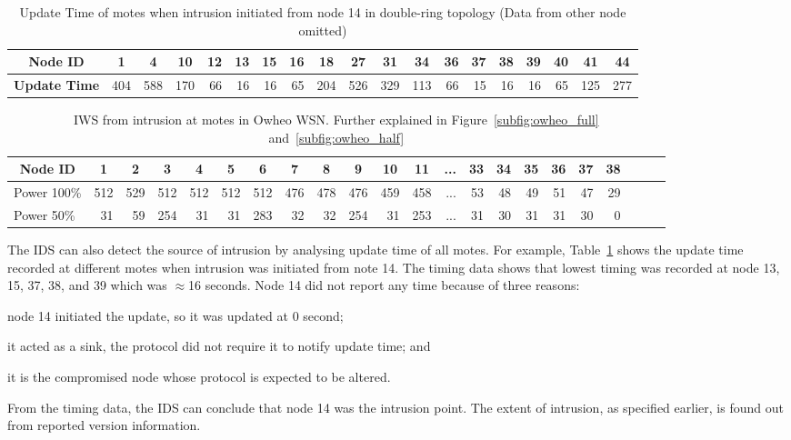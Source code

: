 \documentclass[conference]{IEEEtran}
\newcommand*{\bd}[1]{\multicolumn{1}{|c|}{\bfseries #1}}
\begin{document}
\begin{table}[t]
\centering
\begin{tabular}{|l|*{17}{r|}r|}
\hline
\bd{Node ID}           & \bd{1} & \bd{4} & \bd{10} & \bd{12} & \bd{13} & \bd{15} & \bd{16} & \bd{18} & \bd{27} & \bd{31} & \bd{34} & \bd{36} & \bd{37} & \bd{38} & \bd{39} & \bd{40} & \bd{41} & \bd{44}\\
\hline
\bd{Update Time}  &   404 	&  588 	& 170 	& 66 	& 16 &	 16 	& 65 &	 204 &	 526 & 329 &	 113 &	 66 &	 15 	& 16 	& 16 &	 65 &	125 & 277 \\
\hline
\end{tabular}
\caption{Update Time of motes when intrusion initiated from node 14 in double-ring topology (Data from other node omitted) }
\label{tab:dr_time_14}
\end{table}

\begin{table}[t!]
\centering
\begin{tabular}{|l|*{20}{r|}r|}
\hline
\bd{Node ID}           & \bd{1} & \bd{2} & \bd{3} & \bd{4} & \bd{5} & \bd{6} & \bd{7} & \bd{8} & \bd{9} & \bd{10} & \bd{11} & \bd{...} & \bd{33} & \bd{34} & \bd{35} & \bd{36} & \bd{37} & \bd{38} \\
\hline		\hline

Power 100\%	   & 512 & 529 & 512 & 512 & 512  & 512 & 476 & 478 & 476 & 459 & 458 & ...& 53  & 48 & 49 & 51 & 47 & 29 \\
\hline

Power 50\%	  &31 & 59&254& 31& 31 &283& 32& 32& 254& 31 &253 & ... & 31  & 30 & 31 & 31 & 30 & 0 \\
\hline
\end{tabular}
\caption{IWS from intrusion at motes in Owheo WSN. Further explained in Figure~\ref{subfig:owheo_full} and~\ref{subfig:owheo_half} }
\label{tab:owheo}
\end{table}


The IDS can also detect the source of intrusion by analysing update time of all motes. %
For example, Table~\ref{tab:dr_time_14} shows the update time recorded at different motes when intrusion was initiated from note 14.
The timing data shows that lowest timing was recorded at node 13, 15, 37, 38, and 39 which was $\approx$16 seconds.
Node 14 did not report any time because of three reasons: 
\begin{inparaenum}
\item node 14 initiated the update, so it was updated at $0$ second;
\item it acted as a sink, the protocol did not require it to notify update time; and 
\item it is the compromised node whose protocol is expected to be altered.
\end{inparaenum}
From the timing data, the IDS can conclude that node 14 was the intrusion point.
The extent of intrusion, as specified earlier, is found out from reported version information.
\end{document}
